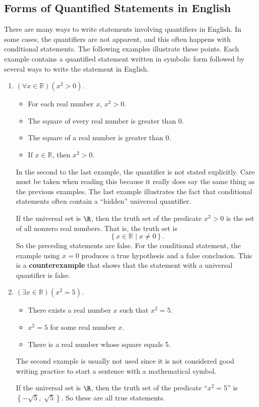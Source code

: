 \subsection*{Forms of Quantified Statements in English}
There are many ways to write statements involving quantifiers in English.  In some cases, the quantifiers are not apparent, and this often happens with conditional statements.  The following examples illustrate these points.  Each example contains a quantified statement written in symbolic form followed by several ways to write the statement in English.
\begin{enumerate}
  \item $\left( {\forall x \in \mathbb{R}} \right)\left( {x^2  > 0} \right)$.
  \begin{itemize}
    \item For each real number  $x$, $x^2  > 0$.
    \item The square of every real number is greater than 0.
    \item The square of a real number is greater than 0.
    \item If  $x \in \mathbb{R}$, then  $x^2  > 0$.
  \end{itemize}
In the second to the last example, the quantifier is not stated explicitly.  Care must be taken when reading this because it really does say the same thing as the previous examples.
The last example illustrates the fact that conditional statements often contain a ``hidden'' universal quantifier.  

If the universal set is  $\R$, then the truth set of the predicate  $x^2  > 0$ is the set of all nonzero real numbers.  That is, the truth set is
\[
\left\{ {x \in \mathbb{R}} \mid x \ne 0 \right\}.
\]
So the preceding statements are false.  For the conditional statement, the example using  
$x = 0$ produces a true hypothesis and a false conclusion.  This is a \textbf{counterexample}
%
\label{D:counterexample}%
 that shows that the statement with a universal quantifier is false.

\item $\left( {\exists x \in \mathbb{R}} \right)\left( {x^2  = 5} \right)$.
  \begin{itemize}
    \item There exists a real number  $x$  such that  $x^2  = 5$.
    \item $x^2  = 5$ for some real number $x$.
    \item There is a real number whose square equals 5.
  \end{itemize}

The second example is usually not used since it is not considered good writing practice to start a sentence with a mathematical symbol. 

If the universal set is  $\R$, then the truth set of the predicate  ``$x^2  = 5$''  is  
$\left\{ { - \sqrt 5 ,\;\sqrt 5 } \right\}$.  So these are all true statements.
\end{enumerate}
\hbreak


\endinput

